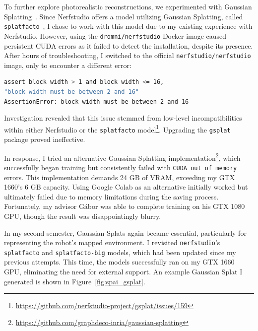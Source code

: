 To further explore photorealistic reconstructions, we experimented with Gaussian Splatting~\cite{3DGS}. Since Nerfstudio offers a model utilizing Gaussian Splatting, called \texttt{splatfacto}~\cite{splatfacto}, I chose to work with this model due to my existing experience with Nerfstudio. However, using the \texttt{dromni/nerfstudio} Docker image caused persistent CUDA errors as it failed to detect the installation, despite its presence. After hours of troubleshooting, I switched to the official \texttt{nerfstudio/nerfstudio} image, only to encounter a different error:

\FloatBarrier
\begin{lstlisting}[language=bash,frame=single,float=!ht]
assert block width > 1 and block width <= 16, 
"block width must be between 2 and 16"
AssertionError: block width must be between 2 and 16
\end{lstlisting}

Investigation revealed that this issue stemmed from low-level incompatibilities within either Nerfstudio or the \texttt{splatfacto} model\footnote{\url{https://github.com/nerfstudio-project/gsplat/issues/159}}. Upgrading the \texttt{gsplat} package proved ineffective.

In response, I tried an alternative Gaussian Splatting implementation\footnote{\url{https://github.com/graphdeco-inria/gaussian-splatting}}, which successfully began training but consistently failed with \texttt{CUDA out of memory} errors. This implementation demands 24 GB of VRAM, exceeding my GTX 1660’s 6 GB capacity. Using Google Colab as an alternative initially worked but ultimately failed due to memory limitations during the saving process. Fortunately, my advisor Gábor was able to complete training on his GTX 1080 GPU, though the result was disappointingly blurry.

In my second semester, Gaussian Splats again became essential, particularly for representing the robot’s mapped environment. I revisited \texttt{nerfstudio}'s \texttt{splatfacto} and \texttt{splatfacto-big} models, which had been updated since my previous attempts. This time, the models successfully ran on my GTX 1660 GPU, eliminating the need for external support. An example Gaussian Splat I generated is shown in Figure~\ref{fig:spai_gsplat}.
